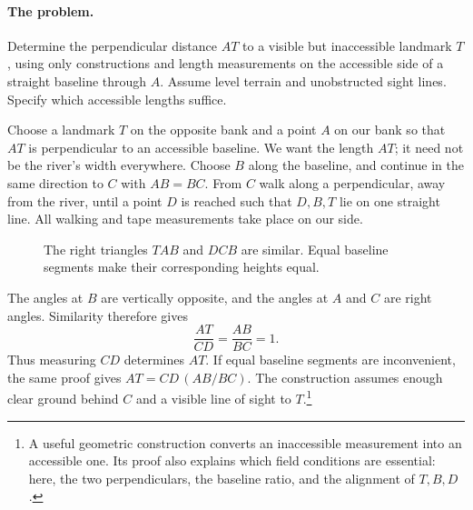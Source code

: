 \paragraph{The problem.}
Determine the perpendicular distance $AT$ to a visible but inaccessible
landmark $T$, using only constructions and length measurements on the
accessible side of a straight baseline through $A$. Assume level terrain
and unobstructed sight lines. Specify which accessible lengths suffice.

Choose a landmark $T$ on the opposite bank and a point $A$ on our bank
so that $AT$ is perpendicular to an accessible baseline. We want the
length $AT$; it need not be the river's width everywhere.
Choose $B$ along the baseline, and continue in the same direction to $C$
with $AB=BC$. From $C$ walk along a perpendicular, away from the river,
until a point $D$ is reached such that $D,B,T$ lie on one straight line.
All walking and tape measurements take place on our side.

\begin{figure}[htbp]\centering
{}
\caption{The right triangles $TAB$ and $DCB$ are similar. Equal baseline segments make their corresponding heights equal.}
\end{figure}

The angles at $B$ are vertically opposite, and the angles at $A$ and $C$
are right angles. Similarity therefore gives
\[
\frac{AT}{CD}=\frac{AB}{BC}=1.
\]
Thus measuring $CD$ determines $AT$. If equal baseline segments are
inconvenient, the same proof gives $AT=CD\,(AB/BC)$.
The construction assumes enough clear ground behind $C$ and a visible
line of sight to $T$.\footnote{A useful geometric construction converts an
inaccessible measurement into an accessible one. Its proof also explains
which field conditions are essential: here, the two perpendiculars,
the baseline ratio, and the alignment of $T,B,D$.}

